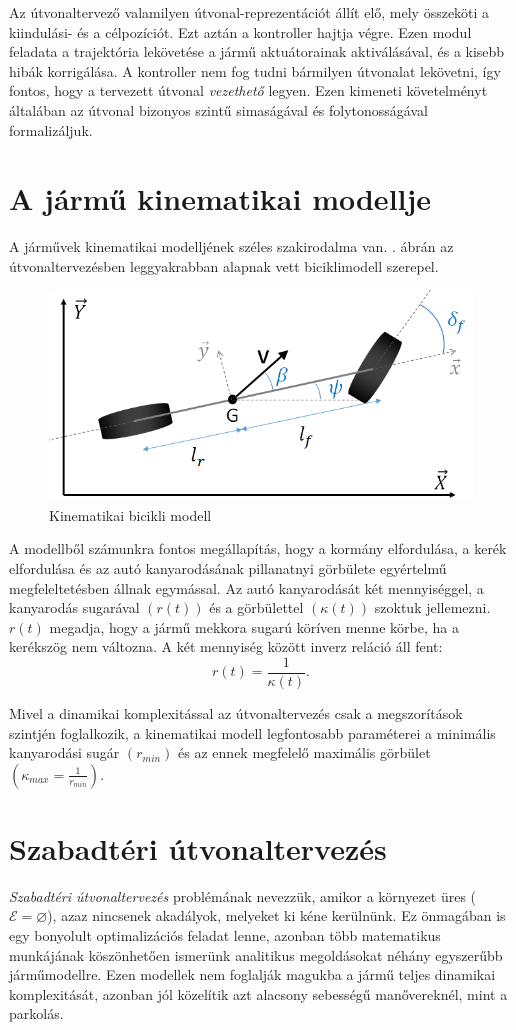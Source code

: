 \documentclass{article}
\begin{document}
Az útvonaltervező valamilyen útvonal-reprezentációt állít elő, mely összeköti a kiindulási- és a célpozíciót. Ezt aztán a kontroller hajtja végre. Ezen modul feladata a trajektória lekövetése a jármű aktuátorainak aktiválásával, és a kisebb hibák korrigálása. A kontroller nem fog tudni bármilyen útvonalat lekövetni, így fontos, hogy a tervezett útvonal \textit{vezethető} legyen. Ezen kimeneti követelményt általában az útvonal bizonyos szintű simaságával és folytonosságával formalizáljuk.

\section{A jármű kinematikai modellje}

A járművek kinematikai modelljének széles szakirodalma \cite{polack2017kinematicBicycleModel} van. . ábrán az útvonaltervezésben leggyakrabban alapnak vett biciklimodell szerepel.

\begin{figure}[ht]
  \centering
  \includegraphics[width=0.5\linewidth]{images/kinematic-bicycle.png}
  \caption[Kinematikai bicikli modell]{Kinematikai bicikli modell \cite{polack2017kinematicBicycleModel}}
  \label{fig:kinematic-bicycle}
\end{figure}

A modellből számunkra fontos megállapítás, hogy a kormány elfordulása, a kerék elfordulása és az autó kanyarodásának pillanatnyi görbülete egyértelmű megfeleltetésben állnak egymással. Az autó kanyarodását két mennyiséggel, a kanyarodás sugarával $(r(t))$ és a görbülettel $(\kappa(t))$ szoktuk jellemezni. $r(t)$ megadja, hogy a jármű mekkora sugarú köríven menne körbe, ha a kerékszög nem változna. A két mennyiség között inverz reláció áll fent: $$r(t) = \frac{1}{\kappa(t)}.$$

Mivel a dinamikai komplexitással az útvonaltervezés csak a megszorítások szintjén foglalkozik, a kinematikai modell legfontosabb paraméterei a minimális kanyarodási sugár $(r_{min})$ és az ennek megfelelő maximális görbület $\left(\kappa_{max} = \frac{1}{r_{min}}\right)$.

\section{Szabadtéri útvonaltervezés}
\textit{Szabadtéri útvonaltervezés} problémának nevezzük, amikor a környezet üres ($\mathcal{E}=\varnothing$), azaz nincsenek akadályok, melyeket ki kéne kerülnünk. Ez önmagában is egy bonyolult optimalizációs feladat lenne, azonban több matematikus munkájának köszönhetően ismerünk analitikus megoldásokat néhány egyszerűbb járműmodellre. Ezen modellek nem foglalják magukba a jármű teljes dinamikai komplexitását, azonban jól közelítik azt alacsony sebességű manővereknél, mint a parkolás.
\end{document}
